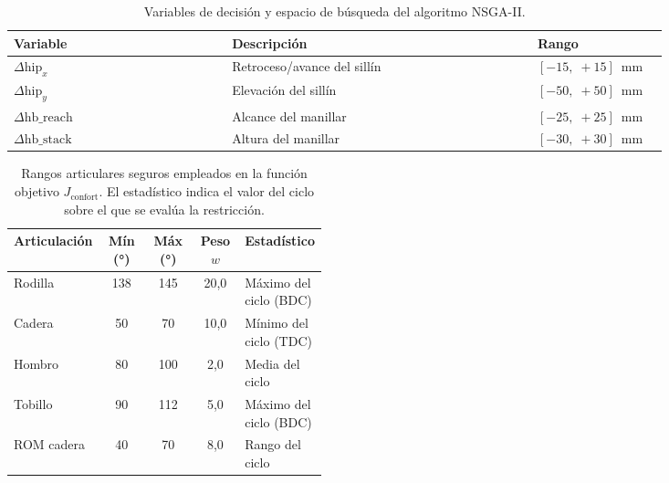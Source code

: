 \begin{table}[H]
      \caption{Variables de decisión y espacio de búsqueda del algoritmo NSGA-II.}
      \label{tab:espacio_nsga2}
      \centering
      \small
      \begin{tabular}{p{0.30\linewidth}p{0.42\linewidth}p{0.18\linewidth}}
            \toprule
            \textbf{Variable} & \textbf{Descripción} & \textbf{Rango} \\
            \midrule
            $\Delta\mathrm{hip}_x$      & Retroceso/avance del sillín  & $[-15,\;+15]$~mm \\
            $\Delta\mathrm{hip}_y$      & Elevación del sillín         & $[-50,\;+50]$~mm \\
            $\Delta\mathrm{hb\_reach}$ & Alcance del manillar         & $[-25,\;+25]$~mm \\
            $\Delta\mathrm{hb\_stack}$ & Altura del manillar          & $[-30,\;+30]$~mm \\
            \bottomrule
      \end{tabular}
\end{table}

\begin{table}[H]
      \caption{Rangos articulares seguros empleados en la función objetivo
            $J_{\text{confort}}$. El estadístico indica el valor del ciclo
            sobre el que se evalúa la restricción.}
      \label{tab:constraints_nsga2}
      \centering
      \small
      \begin{tabular}{p{0.16\linewidth}cccp{0.24\linewidth}}
            \toprule
            \textbf{Articulación} & \textbf{Mín (°)} & \textbf{Máx (°)} &
            \textbf{Peso $w$} & \textbf{Estadístico} \\
            \midrule
            Rodilla    & 138 & 145 & 20{,}0 & Máximo del ciclo (BDC) \\
            Cadera     & 50  & 70  & 10{,}0 & Mínimo del ciclo (TDC) \\
            Hombro     & 80  & 100 &  2{,}0 & Media del ciclo        \\
            Tobillo    & 90  & 112 &  5{,}0 & Máximo del ciclo (BDC) \\
            ROM cadera & 40  & 70  &  8{,}0 & Rango del ciclo        \\
            \bottomrule
      \end{tabular}
\end{table}

